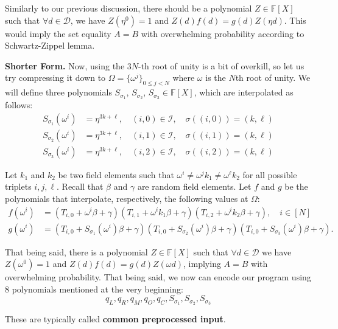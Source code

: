 \documentclass[../../book.tex]{subfiles}
\begin{document}
Similarly to our previous discussion, there should be a polynomial $Z \in
\mathbb{F}[X]$ such that $\forall d \in \mathcal{D}$, we have $Z(\eta^{0}) = 1$ and
$Z(d)f(d) = g(d)Z(\eta d)$. This would imply the set equality $A=B$ with
overwhelming probability according to Schwartz-Zippel lemma.

\textbf{Shorter Form.} Now, using the $3N$-th root of unity is a bit of overkill,
so let us try compressing it down to $\Omega = \{\omega^j\}_{0 \leq j < N}$
where $\omega$ is the $N$th root of unity. We will define three polynomials
$S_{\sigma_1}$, $S_{\sigma_2}$, $S_{\sigma_3} \in \mathbb{F}[X]$, which are
interpolated as follows:
\begin{align*}
    S_{\sigma_1}(\omega^i) &= \eta^{3k+\ell}, \quad (i, 0) \in \mathcal{I}, \quad \sigma((i, 0)) = (k, \ell) \\
    S_{\sigma_2}(\omega^i) &= \eta^{3k+\ell}, \quad (i, 1) \in \mathcal{I}, \quad \sigma((i, 1)) = (k, \ell) \\
    S_{\sigma_3}(\omega^i) &= \eta^{3k+\ell}, \quad (i, 2) \in \mathcal{I}, \quad \sigma((i, 2)) = (k, \ell)
\end{align*}

Let $k_1$ and $k_2$ be two field elements such that $\omega^i \neq \omega^j k_1
\neq \omega^{\ell} k_2$ for all possible triplets $i, j, \ell$. Recall that
$\beta$ and $\gamma$ are random field elements. Let $f$ and $g$ be the
polynomials that interpolate, respectively, the following values at $\Omega$:
\begin{align*}
    f(\omega^i) &=\left(T_{i,0} + \omega^i \beta + \gamma\right)\left(T_{i,1} + \omega^i k_1 \beta + \gamma\right)\left(T_{i,2} + \omega^i k_2 \beta + \gamma\right), \quad i \in [N] \\
    g(\omega^i) &= \left(T_{i,0} + S_{\sigma_1}(\omega^i) \beta + \gamma\right)\left(T_{i,0} + S_{\sigma_2}(\omega^i) \beta + \gamma\right)\left(T_{i,0} + S_{\sigma_3}(\omega^i) \beta + \gamma\right).
\end{align*}

That being said, there is a polynomial $Z \in \mathbb{F}[X]$ such that $\forall
d \in \mathcal{D}$ we have $Z(\omega^{0}) = 1$ and $Z(d)f(d) = g(d)Z(\omega d)$,
implying $A = B$ with overwhelming probability. That being said, we now can
encode our program using 8 polynomials mentioned at the very beginning:
\[q_L, q_R, q_M, q_O, q_C, S_{\sigma_1}, S_{\sigma_2}, S_{\sigma_3}\]

These are typically called \textbf{common preprocessed input}.
\end{document}

